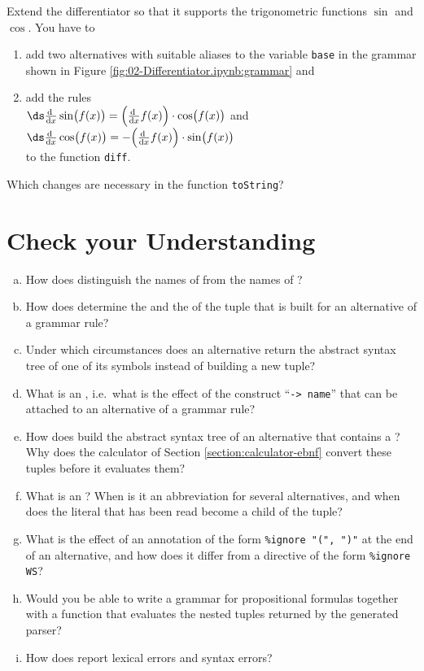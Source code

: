 \exerciseEng
Extend the differentiator so that it supports the trigonometric functions $\sin$ and $\cos$.  You have to
\begin{enumerate}
\item add two alternatives with suitable aliases to the variable \texttt{base} in the grammar shown in Figure
      \ref{fig:02-Differentiator.ipynb:grammar} and
\item add the rules
      \\[0.2cm]
      \hspace*{1.3cm}
      $\ds\frac{\mathrm{d}\;}{\mathrm{d}x}\sin\bigl(f(x)\bigr)
       = \Bigl(\frac{\mathrm{d}\;}{\mathrm{d}x} f(x)\Bigr) \cdot \cos\bigl(f(x)\bigr)$
      \quad and \quad
      $\ds\frac{\mathrm{d}\;}{\mathrm{d}x}\cos\bigl(f(x)\bigr)
       = -\Bigl(\frac{\mathrm{d}\;}{\mathrm{d}x} f(x)\Bigr) \cdot \sin\bigl(f(x)\bigr)$
      \\[0.2cm]
      to the function \texttt{diff}.
\end{enumerate}
Which changes are necessary in the function \texttt{toString}? \eox
\pagebreak

\section{Check your Understanding}
\begin{enumerate}[(a)]
\item How does  distinguish the names of  from the names of
      ?
\item How does  determine the  and the  of the tuple that is built
      for an alternative of a grammar rule?
\item Under which circumstances does an alternative return the abstract syntax tree of one of its symbols
      instead of building a new tuple?
\item What is an , i.e.~what is the effect of the construct ``\texttt{-> name}'' that can be
      attached to an alternative of a grammar rule?
\item How does  build the abstract syntax tree of an alternative that contains a
      ?  Why does the calculator of Section \ref{section:calculator-ebnf} convert these tuples
      before it evaluates them?
\item What is an ?  When is it an abbreviation for several alternatives, and when does
      the literal that has been read become a child of the tuple?
\item What is the effect of an annotation of the form \texttt{\%ignore "(", ")"} at the end of an alternative,
      and how does it differ from a directive of the form \texttt{\%ignore WS}?
\item Would you be able to write a  grammar for propositional formulas together with a
      function that evaluates the nested tuples returned by the generated parser?
\item How does  report lexical errors and syntax errors?
\end{enumerate}


